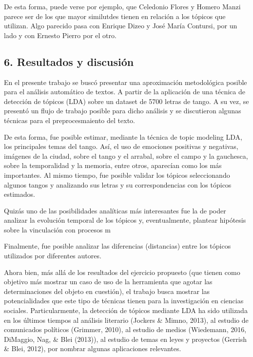 \documentclass[]{article}
\begin{document}
De esta forma, puede verse por ejemplo, que Celedonio Flores y Homero
Manzi parece ser de los que mayor similutdes tienen en relación a los
tópicos que utilizan. Algo parecido pasa con Enrique Dizeo y José María
Contursi, por un lado y con Ernesto Pierro por el otro.

\subsection{6. Resultados y discusión}\label{resultados-y-discusiuxf3n}

En el presente trabajo se buscó presentar una aproximación metodológica
posible para el análisis automático de textos. A partir de la aplicación
de una técnica de detección de tópicos (LDA) sobre un dataset de 5700
letras de tango. A su vez, se presentó un flujo de trabajo posible para
dicho análisis y se discutieron algunas técnicas para el
preprocesmaiento del texto.

De esta forma, fue posible estimar, mediante la técnica de topic
modeling LDA, los principales temas del tango. Así, el uso de emociones
positivas y negativas, imágenes de la ciudad, sobre el tango y el
arrabal, sobre el campo y la gauchesca, sobre la temporalidad y la
memoria, entre otros, aparecían como los más importantes. Al mismo
tiempo, fue posible validar los tópicos seleccionando algunos tangos y
analizando sus letras y su correspondencias con los tópicos estimados.

Quizás uno de las posibilidades analíticas más interesantes fue la de
poder analizar la evolución temporal de los tópicos y, eventualmente,
plantear hipótesis sobre la vinculación con procesos m

Finalmente, fue posible analizar las diferencias (distancias) entre los
tópicos utilizados por diferentes autores.

Ahora bien, más allá de los resultados del ejercicio propuesto (que
tienen como objetivo más mostrar un caso de uso de la herramienta que
agotar las determinaciones del objeto en cuestión), el trabajo busca
mostrar las potencialidades que este tipo de técnicas tienen para la
investigación en ciencias sociales. Particularmente, la detección de
tópicos mediante LDA ha sido utilizada en los últimos tiempos al
análisis literario (Jockers \& Mimno, 2013), al estudio de comunicados
políticos (Grimmer, 2010), al estudio de medios (Wiedemann, 2016,
DiMaggio, Nag, \& Blei (2013)), al estudio de temas en leyes y proyectos
(Gerrish \& Blei, 2012), por nombrar algunas aplicaciones relevantes.
\end{document}
